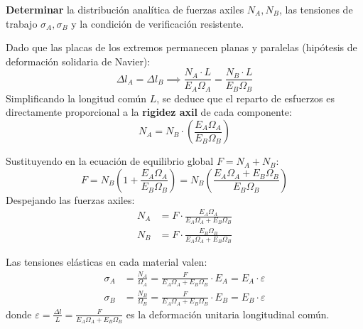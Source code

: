 {\begin{center}
{%
        }
    \end{center}

    \textbf{Determinar} la distribución analítica de fuerzas axiles $N_A, N_B$, las tensiones de trabajo $\sigma_A, \sigma_B$ y la condición de verificación resistente.

    \tcblower


    Dado que las placas de los extremos permanecen planas y paralelas (hipótesis de deformación solidaria de Navier):
    \begin{equation}
        \Delta l_A = \Delta l_B \implies \frac{N_A \cdot L}{E_A \Omega_A} = \frac{N_B \cdot L}{E_B \Omega_B}
    \end{equation}
    Simplificando la longitud común $L$, se deduce que el reparto de esfuerzos es directamente proporcional a la \textbf{rigidez axil} de cada componente:
    \begin{equation}
        N_A = N_B \cdot \left( \frac{E_A \Omega_A}{E_B \Omega_B} \right)
    \end{equation}


    Sustituyendo en la ecuación de equilibrio global $F = N_A + N_B$:
    \begin{equation}
        F = N_B \left( 1 + \frac{E_A \Omega_A}{E_B \Omega_B} \right) = N_B \left( \frac{E_A \Omega_A + E_B \Omega_B}{E_B \Omega_B} \right)
    \end{equation}
    Despejando las fuerzas axiles:
    \begin{align}
        N_A & = F \cdot \frac{E_A \Omega_A}{E_A \Omega_A + E_B \Omega_B} \\
        N_B & = F \cdot \frac{E_B \Omega_B}{E_A \Omega_A + E_B \Omega_B}
    \end{align}


    Las tensiones elásticas en cada material valen:
    \begin{align}
        \sigma_A & = \frac{N_A}{\Omega_A} = \frac{F}{E_A \Omega_A + E_B \Omega_B} \cdot E_A = E_A \cdot \varepsilon \\
        \sigma_B & = \frac{N_B}{\Omega_B} = \frac{F}{E_A \Omega_A + E_B \Omega_B} \cdot E_B = E_B \cdot \varepsilon
    \end{align}
    donde $\varepsilon = \frac{\Delta l}{L} = \frac{F}{E_A \Omega_A + E_B \Omega_B}$ es la deformación unitaria longitudinal común.

}
